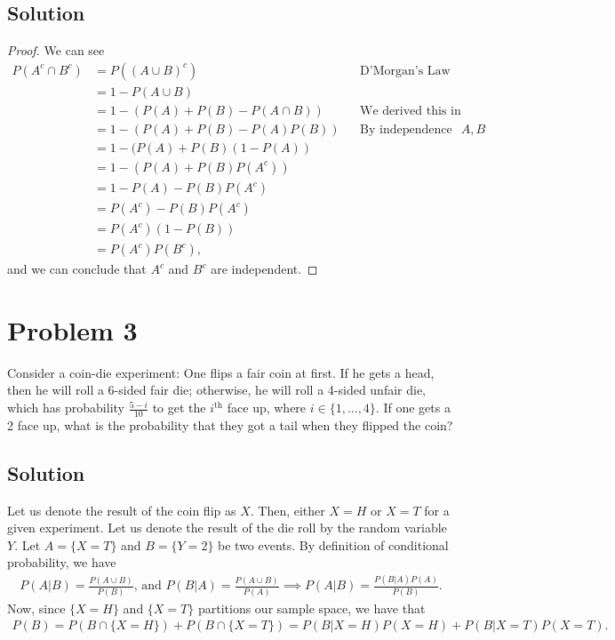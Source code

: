 \documentclass[10pt,a4paper]{article}
\theoremstyle{theorem}
\theoremstyle{definition}
\begin{document}
\subsection*{Solution}
\begin{proof}
We can see
\begin{align*}
P(A^c \cap B^c) &= P((A \cup B)^c) && \text{D'Morgan's Law}\\
&= 1 - P(A \cup B)\\
&= 1 - (P(A) + P(B) - P(A \cap B)) && \text{We derived this in class}\\
&= 1 - (P(A) + P(B) - P(A)P(B)) && \text{By independence of } A,B\\
&= 1 - (P(A) + P(B)(1-P(A))\\
&= 1 - (P(A) + P(B)P(A^c))\\
&= 1 - P(A) - P(B)P(A^c)\\
&= P(A^c) - P(B)P(A^c)\\
&= P(A^c)(1  - P(B))\\
&= P(A^c)P(B^c),
\end{align*}
and we can conclude that $A^c$ and $B^c$ are independent.
\end{proof}

\section*{Problem 3}
Consider a coin-die experiment: One flips a fair coin at first. If he gets a head, then he will
roll a 6-sided fair die; otherwise, he will roll a 4-sided unfair die, which has probability $\frac{5 - i}
{10}$ to
get the $i^\text{th}$ face up, where $i \in \{1,...,4\}$.  If one gets a 2 face up, what is the probability that they got a tail
when they flipped the coin?

\subsection*{Solution}
Let us denote the result of the coin flip as $X$.  Then, either $X = H$ or $X = T$ for a given experiment. Let us denote the result of the die roll by the random variable $Y$. Let $A = \{X = T\}$ and $B = \{Y = 2\}$ be two events. By definition of conditional probability, we have
\begin{align*}
P(A|B) = \frac{P(A \cup B)}{P(B)} \text{, and } P(B|A) = \frac{P(A \cup B)}{P(A)} \implies P(A|B) = \frac{P(B|A) P(A)}{P(B)}.
\end{align*}
Now, since $\{X =H\}$ and $\{X = T\}$ partitions our sample space, we have that 
\begin{align*}
P(B) = P(B \cap \{X = H\}) + P(B \cap \{X = T\}) =  P(B| X = H) P(X = H) + P(B| X = T) P(X = T).
\end{align*}
\end{document}
